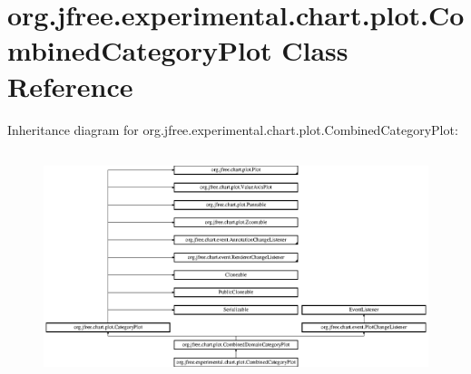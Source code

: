 \hypertarget{classorg_1_1jfree_1_1experimental_1_1chart_1_1plot_1_1_combined_category_plot}{}\section{org.\+jfree.\+experimental.\+chart.\+plot.\+Combined\+Category\+Plot Class Reference}
\label{classorg_1_1jfree_1_1experimental_1_1chart_1_1plot_1_1_combined_category_plot}
Inheritance diagram for org.\+jfree.\+experimental.\+chart.\+plot.\+Combined\+Category\+Plot\+:\begin{figure}[H]
\begin{center}
\leavevmode
\includegraphics[height=6.706587cm]{classorg_1_1jfree_1_1experimental_1_1chart_1_1plot_1_1_combined_category_plot}
\end{center}
\end{figure}
